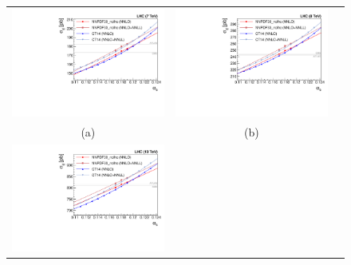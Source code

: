 \newcommand{\FitFigureWidth}{0.44}  
\begin{figure}[t]
\centering
\begin{tabular}{ccc}
\includegraphics[width=\FitFigureWidth\linewidth]{img/alphas/fits_ATLAS7000.pdf}
&
\includegraphics[width=\FitFigureWidth\linewidth]{img/alphas/fits_ATLAS8000.pdf}
\\[-8pt]
(a) & (b) \\[-3pt]
%
\includegraphics[width=\FitFigureWidth\linewidth]{img/alphas/fits_ATLAS13000.pdf}

\end{tabular}
\end{figure}
